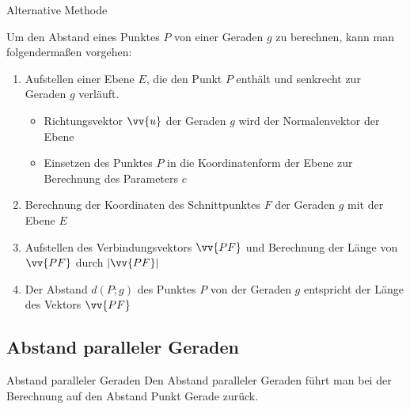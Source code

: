 \begin{bem}{Alternative Methode}{}
\begin{center}
    \end{center}
        Um den Abstand eines Punktes \(P\) von einer Geraden \(g\) zu berechnen, kann man folgendermaßen vorgehen:
        \begin{enumerate}
            \item Aufstellen einer Ebene \(E\), die den Punkt \(P\) enthält und senkrecht zur Geraden \(g\) verläuft.
            \begin{itemize}
                \item Richtungsvektor \(\vv{u}\) der Geraden \(g\) wird der Normalenvektor der Ebene
                \item Einsetzen des Punktes \(P\) in die Koordinatenform der Ebene zur Berechnung des Parameters \(c\)
            \end{itemize}
            \item Berechnung der Koordinaten des Schnittpunktes \(F\) der Geraden \(g\) mit der Ebene \(E\)
            \item Aufstellen des Verbindungsvektors \(\vv{PF}\) und Berechnung der Länge von \(\vv{PF}\) durch \(\left|\vv{PF}\right|\)
            \item Der Abstand \(d(P;g)\) des Punktes \(P\) von der Geraden \(g\) entspricht der Länge des Vektors \(\vv{PF}\)
        \end{enumerate}
    \end{bem}
    \subsection{Abstand paralleler Geraden}
    \begin{merke}{Abstand paralleler Geraden}{}
       Den Abstand paralleler Geraden führt man bei der Berechnung auf den Abstand Punkt Gerade zurück. 
    \end{merke}
